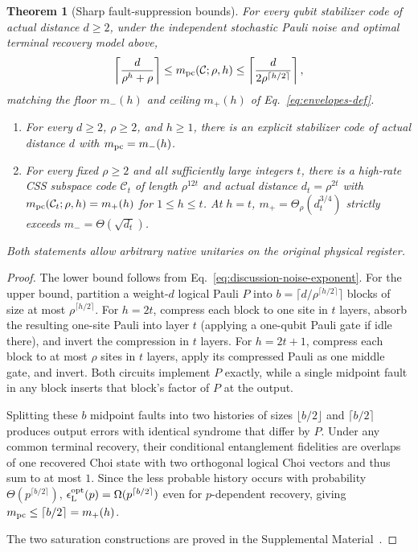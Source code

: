 \documentclass[aps,prl,reprint,notitlepage,nofootinbib,nobibnotes]{revtex4-2}
\newtheorem{theorem}{Theorem}
\begin{document}
\begin{theorem}[Sharp fault-suppression bounds]\label{thm:fault-sharpness}
For every qubit stabilizer code of actual distance $d\ge2$, under the independent stochastic
Pauli noise and optimal terminal recovery model above,
\begin{equation}\label{eq:discussion-fixed-code-exponent}
 \left\lceil\frac{d}{\rho^h+\rho}\right\rceil
 \le m_{\rm pc}(\mathcal C;\rho,h)
 \le \left\lceil\frac{d}{2\rho^{\lceil h/2\rceil}}\right\rceil,
\end{equation}
matching the floor $m_-(h)$ and ceiling $m_+(h)$ of Eq.~\eqref{eq:envelopes-def}.
\begin{enumerate}
\item[(1)] For every $d\ge2$, $\rho\ge2$, and $h\ge1$, there is an explicit stabilizer
code of actual distance $d$ with $m_{\rm pc}=m_-(h)$.
\item[(2)] For every fixed $\rho\ge2$ and all sufficiently large integers $t$, there is a high-rate
CSS subspace code $\mathcal C_t$ of length $\rho^{12t}$ and actual distance $d_t=\rho^{2t}$ with
$m_{\rm pc}(\mathcal C_t;\rho,h)=m_+(h)$ for $1\le h\le t$. At $h=t$, $m_+=\Theta_\rho(d_t^{3/4})$
strictly exceeds $m_-=\Theta(\sqrt{d_t})$.
\end{enumerate}
Both statements allow arbitrary native unitaries on the original physical register.
\end{theorem}

\begin{proof}
The lower bound follows from Eq.~\eqref{eq:discussion-noise-exponent}. For the upper bound,
partition a weight-$d$ logical Pauli $P$ into $b=\lceil d/\rho^{\lceil h/2\rceil}\rceil$ blocks of
size at most $\rho^{\lceil h/2\rceil}$. For $h=2t$, compress each block to one site in $t$ layers,
absorb the resulting one-site Pauli into layer $t$ (applying a one-qubit Pauli gate if idle there),
and invert the compression in $t$ layers. For $h=2t+1$, compress each block to at most $\rho$ sites
in $t$ layers, apply its compressed Pauli as one middle gate, and invert. Both circuits implement
$P$ exactly, while a single midpoint fault in any block inserts that block's factor of $P$ at the
output.

Splitting these $b$ midpoint faults into two histories of sizes $\lfloor b/2\rfloor$ and $\lceil
b/2\rceil$ produces output errors with identical syndrome that differ by $P$. Under any common
terminal recovery, their conditional entanglement fidelities are overlaps of one recovered Choi
state with two orthogonal logical Choi vectors and thus sum to at most $1$. Since the less probable
history occurs with probability $\Theta(p^{\lceil b/2\rceil})$, $\epsilon_{\rm L}^{\rm
opt}(p)=\Omega(p^{\lceil b/2\rceil})$ even for $p$-dependent recovery, giving $m_{\rm pc}\le\lceil
b/2\rceil=m_+(h)$.

The two saturation constructions are proved in the Supplemental Material~\cite{Supplement}.
\end{proof}
\end{document}
